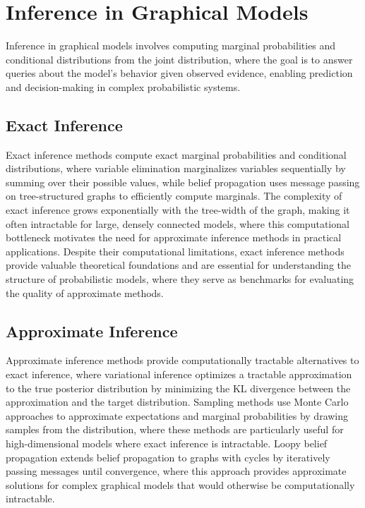 
\section{Inference in Graphical Models }
\label{sec:inference}

Inference in graphical models involves computing marginal probabilities and conditional distributions from the joint distribution, where the goal is to answer queries about the model's behavior given observed evidence, enabling prediction and decision-making in complex probabilistic systems.

\subsection{Exact Inference}

Exact inference methods compute exact marginal probabilities and conditional distributions, where variable elimination marginalizes variables sequentially by summing over their possible values, while belief propagation uses message passing on tree-structured graphs to efficiently compute marginals. The complexity of exact inference grows exponentially with the tree-width of the graph, making it often intractable for large, densely connected models, where this computational bottleneck motivates the need for approximate inference methods in practical applications. Despite their computational limitations, exact inference methods provide valuable theoretical foundations and are essential for understanding the structure of probabilistic models, where they serve as benchmarks for evaluating the quality of approximate methods.

\subsection{Approximate Inference}

Approximate inference methods provide computationally tractable alternatives to exact inference, where variational inference optimizes a tractable approximation to the true posterior distribution by minimizing the KL divergence between the approximation and the target distribution. Sampling methods use Monte Carlo approaches to approximate expectations and marginal probabilities by drawing samples from the distribution, where these methods are particularly useful for high-dimensional models where exact inference is intractable. Loopy belief propagation extends belief propagation to graphs with cycles by iteratively passing messages until convergence, where this approach provides approximate solutions for complex graphical models that would otherwise be computationally intractable.

